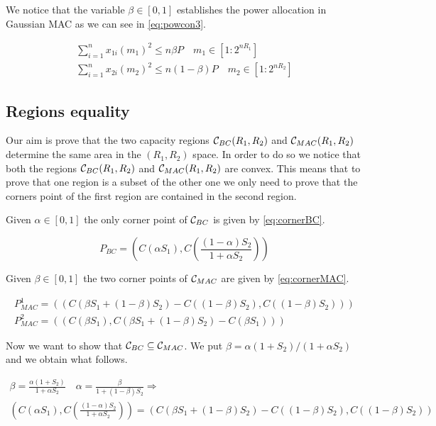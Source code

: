 We notice that the variable $\beta \in [0,1]$ establishes the power allocation in Gaussian MAC as we can see in \eqref{eq:powcon3}.

\begin{equation}
	\begin{gathered}
		\sum_{i=1}^n x_{1i}(m_1)^2 \leq n \beta P \quad m_1 \in [1:2^{nR_1}]\\
		\sum_{i=1}^n x_{2i}(m_2)^2 \leq n (1- \beta ) P \quad m_2 \in [1:2^{nR_2}]
	\end{gathered}
	\label{eq:powcon3}
\end{equation}

\subsection{Regions equality}

Our aim is prove that the two capacity regions $\mathcal{C}_{BC}(R_1, R_2)$ and $\mathcal{C}_{MAC}(R_1, R_2)$ determine the same area in the $(R_1, R_2)$ space. In order to do so we notice that both the regions $\mathcal{C}_{BC}(R_1, R_2)$ and $\mathcal{C}_{MAC}(R_1, R_2)$ are convex. This means that to prove that one region is a subset of the other one we only need to prove that the corners point of the first region are contained in the second region.

Given $\alpha \in [0,1]$ the only corner point of $\mathcal{C}_{BC}$ is given by \eqref{eq:cornerBC}.

\begin{equation}
	P_{BC} = \left( C(\alpha S_1) , C \left( \frac{(1-\alpha)S_2}{1+\alpha S_2} \right) \right)
	\label{eq:cornerBC}
\end{equation}

Given $\beta \in [0,1]$ the two corner points of $\mathcal{C}_{MAC}$ are given by \eqref{eq:cornerMAC}.

\begin{equation}
	\begin{gathered}
		P_{MAC}^1 = (\left( C (\beta S_1 + (1-\beta)S_2) - C((1-\beta)S_2) , C \left( (1-\beta)S_2 \right) \right)) \\ P_{MAC}^2 = (\left(C \left(\beta S_1 \right), C (\beta S_1 + (1-\beta)S_2) - C(\beta S_1) \right))
	\end{gathered}
	\label{eq:cornerMAC}
\end{equation}

Now we want to show that $\mathcal{C}_{BC} \subseteq \mathcal{C}_{MAC}$. We put $\beta = \alpha(1+S_2)/(1+\alpha S_2)$ and we obtain what follows.

\begin{gather*}
	\beta = \frac{\alpha(1+S_2)}{1+\alpha S_2} \quad  \alpha = \frac{\beta}{1+ (1-\beta) S_2} \Rightarrow \\
	\left( C(\alpha S_1) , C \left( \frac{(1-\alpha)S_2}{1+\alpha S_2} \right) \right) = \left( C (\beta S_1 + (1-\beta)S_2) - C((1-\beta)S_2) , C \left( (1-\beta)S_2 \right) \right)
\end{gather*}

